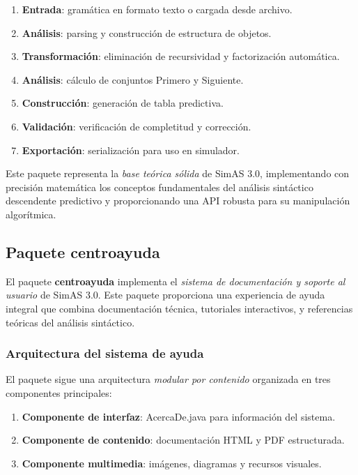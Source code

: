 \begin{enumerate}
    \item \textbf{Entrada}: gramática en formato texto o cargada desde archivo.
    \item \textbf{Análisis}: parsing y construcción de estructura de objetos.
    \item \textbf{Transformación}: eliminación de recursividad y factorización automática.
    \item \textbf{Análisis}: cálculo de conjuntos Primero y Siguiente.
    \item \textbf{Construcción}: generación de tabla predictiva.
    \item \textbf{Validación}: verificación de completitud y corrección.
    \item \textbf{Exportación}: serialización para uso en simulador.
\end{enumerate}

Este paquete representa la \textit{base teórica sólida} de SimAS 3.0, implementando con precisión matemática los conceptos fundamentales del análisis sintáctico descendente predictivo y proporcionando una API robusta para su manipulación algorítmica.

\subsection{Paquete centroayuda}

El paquete \textbf{centroayuda} implementa el \textit{sistema de documentación y soporte al usuario} de SimAS 3.0. Este paquete proporciona una experiencia de ayuda integral que combina documentación técnica, tutoriales interactivos, y referencias teóricas del análisis sintáctico.

\subsubsection{Arquitectura del sistema de ayuda}

El paquete sigue una arquitectura \textit{modular por contenido} organizada en tres componentes principales:

\begin{enumerate}
    \item \textbf{Componente de interfaz}: AcercaDe.java para información del sistema.
    \item \textbf{Componente de contenido}: documentación HTML y PDF estructurada.
    \item \textbf{Componente multimedia}: imágenes, diagramas y recursos visuales.
\end{enumerate}

